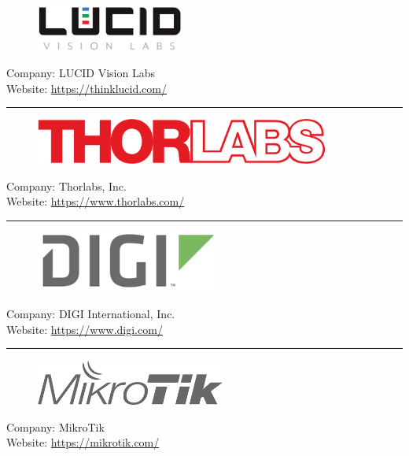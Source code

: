 \begin{figure}[h!]
\includegraphics[height=1.5cm]{Pictures/AppLucidLogo}
\end{figure}
\vspace{3mm}
Company: LUCID Vision Labs\\
Website: \url{https://thinklucid.com/}
\vspace{5mm}
\hrule
\vspace{10mm}

\begin{figure}[h!]
\includegraphics[height=1.5cm]{Pictures/AppThorlabsLogo}
\end{figure}
\vspace{3mm}
Company: Thorlabs, Inc.\\
Website: \url{https://www.thorlabs.com/}
\vspace{5mm}
\hrule
\vspace{10mm}

\begin{figure}[h!]
\includegraphics[height=2cm]{Pictures/AppDIGILogo}
\end{figure}
\vspace{3mm}
Company: DIGI International, Inc.\\
Website: \url{https://www.digi.com/}
\vspace{5mm}
\hrule
\vspace{10mm}

\begin{figure}[h!]
\includegraphics[height=1.5cm]{Pictures/AppMikroTikLogo}
\end{figure}
\vspace{3mm}
Company: MikroTik\\
Website: \url{https://mikrotik.com/}












